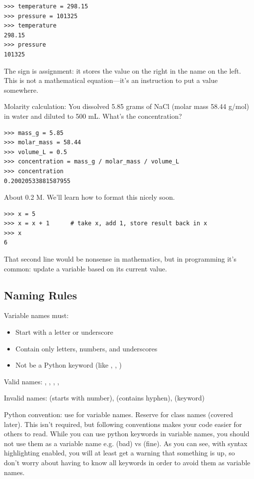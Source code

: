 \begin{lstlisting}
>>> temperature = 298.15
>>> pressure = 101325
>>> temperature
298.15
>>> pressure
101325
\end{lstlisting}

The \py{=} sign is assignment: it stores the value on the right in the name on the left. This is not a mathematical equation---it's an instruction to put a value somewhere.

\begin{labexample}
Molarity calculation: You dissolved 5.85 grams of NaCl (molar mass 58.44 g/mol) in water and diluted to 500 mL. What's the concentration?

\begin{lstlisting}
>>> mass_g = 5.85
>>> molar_mass = 58.44
>>> volume_L = 0.5
>>> concentration = mass_g / molar_mass / volume_L
>>> concentration
0.20020533881587955
\end{lstlisting}

About 0.2 M. We'll learn how to format this nicely soon.
\end{labexample}

\begin{lstlisting}
>>> x = 5
>>> x = x + 1      # take x, add 1, store result back in x
>>> x
6
\end{lstlisting}

That second line would be nonsense in mathematics, but in programming it's common: update a variable based on its current value.

\subsection{Naming Rules}

Variable names must:
\begin{itemize}
    \item Start with a letter or underscore
    \item Contain only letters, numbers, and underscores
    \item Not be a Python keyword (like , , )
\end{itemize}

Valid names: , , , , 

Invalid names:  (starts with number),  (contains hyphen),  (keyword)

\begin{tip}
Python convention: use  for variable names. Reserve  for class names (covered later). This isn't required, but following conventions makes your code easier for others to read. While you can use python keywords in variable names, you should not use them as a variable name e.g.  (bad) vs  (fine). As you can see, with syntax highlighting enabled, you will at least get a warning that something is up, so don't worry about having to know all keywords in order to avoid them as variable names.
\end{tip}

